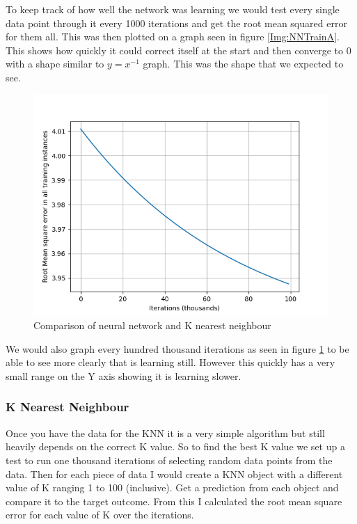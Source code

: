 \documentclass[11pt]{article}
\begin{document}
	 To keep track of how well the network was learning we would test every single data point through it every 1000 iterations and get the root mean squared error for them all. This was then plotted on a graph seen in figure \ref{Img:NNTrainA}. This shows how quickly it could correct itself at the start and then converge to 0 with a shape similar to $y=x^{-1}$ graph. This was the shape that we expected to see.
	 
	 \begin{figure}[!htb]
	 	\centering
	 		\includegraphics{Resources/PartTwo/LearningGraphs/20220111_184633_1000_1.png}
	 		\caption{Comparison of neural network and K nearest neighbour}
	 		\label{Img:NNTrainB}
	 \end{figure}
 
 	We would also graph every hundred thousand iterations  as seen in figure \ref{Img:NNTrainB} to be able to see more clearly that is learning still. However this quickly has a very small range on the Y axis showing it is learning slower.
	
	\subsubsection{K Nearest Neighbour}
	Once you have the data for the KNN it is a very simple algorithm but still heavily depends on the correct K value. So to find the best K value we set up a test to run one thousand iterations of selecting random data points from the data. Then for each piece of data I would create a KNN object with a different value of K ranging 1 to 100 (inclusive). Get a prediction from each object and compare it to the target outcome. From this I calculated the root mean square error for each value of K over the iterations.
	
\end{document}
